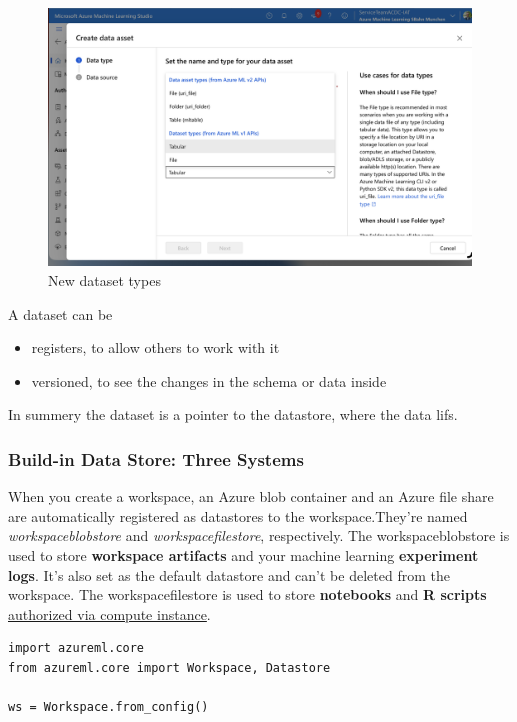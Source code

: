 \begin{figure}[H]
	\centering
	\includegraphics[scale = 0.1]{attachment/chapter_10/Scc008}
	\caption{New dataset types}
\end{figure}

A dataset can be 
\begin{itemize}
	\item registers, to allow others to work with it 
	\item versioned, to see the changes in the schema or data inside
\end{itemize}

In summery the dataset is a pointer to the datastore, where the data lifs.

\subsubsection{Build-in Data Store: Three Systems}
When you create a workspace, an Azure blob container and an Azure file share are automatically registered as datastores to the workspace.They're named \textit{workspaceblobstore} and \textit{workspacefilestore}, respectively. The workspaceblobstore is used to store \textbf{workspace artifacts} and your machine learning \textbf{experiment logs}. It's also set as the default datastore and can't be deleted from the workspace. The workspacefilestore is used to store \textbf{notebooks} and \textbf{R scripts} \underline{authorized via compute instance}.

\begin{lstlisting}[style=python]
import azureml.core
from azureml.core import Workspace, Datastore
     
ws = Workspace.from_config()	
\end{lstlisting}

